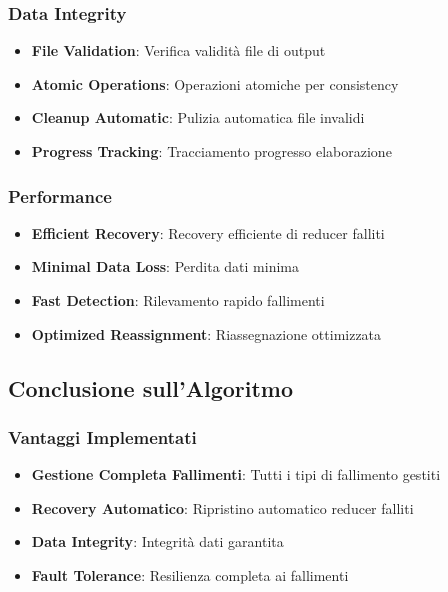 \documentclass[12pt,a4paper]{article}
\begin{document}
\subsubsection{Data Integrity}

\begin{itemize}
\item \textbf{File Validation}: Verifica validità file di output
\item \textbf{Atomic Operations}: Operazioni atomiche per consistency
\item \textbf{Cleanup Automatic}: Pulizia automatica file invalidi
\item \textbf{Progress Tracking}: Tracciamento progresso elaborazione
\end{itemize}

\subsubsection{Performance}

\begin{itemize}
\item \textbf{Efficient Recovery}: Recovery efficiente di reducer falliti
\item \textbf{Minimal Data Loss}: Perdita dati minima
\item \textbf{Fast Detection}: Rilevamento rapido fallimenti
\item \textbf{Optimized Reassignment}: Riassegnazione ottimizzata
\end{itemize}

\subsection{Conclusione sull'Algoritmo}

\subsubsection{Vantaggi Implementati}

\begin{itemize}
\item \textbf{Gestione Completa Fallimenti}: Tutti i tipi di fallimento gestiti
\item \textbf{Recovery Automatico}: Ripristino automatico reducer falliti
\item \textbf{Data Integrity}: Integrità dati garantita
\item \textbf{Fault Tolerance}: Resilienza completa ai fallimenti
\end{itemize}
\end{document}
